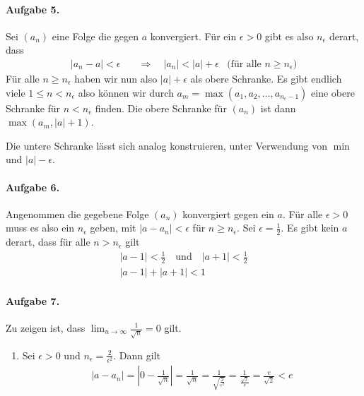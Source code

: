 \documentclass{article}
\begin{document}
\paragraph{Aufgabe 5.}

Sei $(a_n)$ eine Folge die gegen $a$ konvergiert. Für ein $\epsilon > 0$ gibt es also $n_\epsilon$ derart, dass
\begin{align*}
    |a_n - a| < \epsilon& \quad \Longrightarrow \quad |a_n| < |a| + \epsilon &\text{(für alle $n \geq n_\epsilon$)}
\end{align*}
Für alle $n \geq n_\epsilon$ haben wir nun also $|a| + \epsilon$ als obere Schranke. Es gibt endlich viele $1 \leq n < n_\epsilon$ also können wir durch $a_m = \max(a_1, a_2, \ldots, a_{n_\epsilon - 1})$ eine obere Schranke für $n < n_\epsilon$ finden. Die obere Schranke für $(a_n)$ ist dann $\max(a_m, |a| + 1)$.

Die untere Schranke lässt sich analog konstruieren, unter Verwendung von $\min$ und $|a| - \epsilon$.

\paragraph{Aufgabe 6.}

Angenommen die gegebene Folge $(a_n)$ konvergiert gegen ein $a$. Für alle $\epsilon > 0$ muss es also ein $n_\epsilon$ geben, mit $|a - a_n| < \epsilon$ für $n \geq n_\epsilon$. Sei $\epsilon = \frac{1}{2}$. Es gibt kein $a$ derart, dass für alle $n > n_\epsilon$ gilt
\begin{align*}
    |a - 1| < \frac{1}{2} \quad \text{und} \quad |a + 1| < \frac{1}{2} \\
    |a - 1| + |a + 1| < 1
\end{align*}

\paragraph{Aufgabe 7.}

Zu zeigen ist, dass $\lim_{n \to \infty} \frac{1}{\sqrt{n}} = 0$ gilt.

\begin{enumerate}
    \item Sei $\epsilon > 0$ und $n_\epsilon = \frac{2}{\epsilon^2}$. Dann gilt
    \begin{align*}
        |a - a_n| = \left|0 - \frac{1}{\sqrt{n}}\right| = \frac{1}{\sqrt{n}}
        = \frac{1}{\sqrt{\frac{2}{\epsilon^2}}}
        = \frac{1}{\frac{\sqrt{2}}{e}}
        = \frac{e}{\sqrt{2}} < e
    \end{align*}
\end{enumerate}
\end{document}
